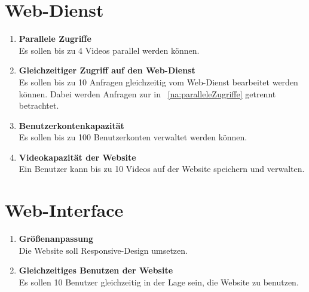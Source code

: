\section{\gls{Web-Dienst}}
\begin{enumerate}
\renewcommand{\labelenumi}{\textbf{\theenumi}}
\renewcommand{\theenumi}{NA\arabic{enumi}0}
\setcounter{enumi}{199}

\item \label{na:paralleleZugriffe}\textbf{Parallele Zugriffe} \hfill\\  Es sollen bis zu 4 Videos parallel  werden können.

\item \textbf{Gleichzeitiger Zugriff auf den \gls{Web-Dienst}} \hfill\\  Es sollen bis zu 10 Anfragen gleichzeitig vom \gls{Web-Dienst} bearbeitet werden können. Dabei werden Anfragen zur  in ~\eqref{na:paralleleZugriffe} getrennt betrachtet.

\item \textbf{Benutzerkontenkapazität} \hfill\\  Es sollen bis zu 100 Benutzerkonten verwaltet werden können.

\item \label{na:VideoKap}\textbf{Videokapazität der Website} \hfill\\  Ein Benutzer kann bis zu 10 Videos auf der Website speichern und verwalten.

\end{enumerate}

\section{\gls{Web-Interface}}
\begin{enumerate}
\renewcommand{\labelenumi}{\textbf{\theenumi}}
\renewcommand{\theenumi}{NA\arabic{enumi}0}
\setcounter{enumi}{299}

\item \textbf{Größenanpassung} \hfill\\  Die Website soll \gls{Responsive-Design} umsetzen.

\item \textbf{Gleichzeitiges Benutzen der Website} \hfill\\  Es sollen 10 Benutzer gleichzeitig in der Lage sein, die Website zu benutzen.

\end{enumerate}





